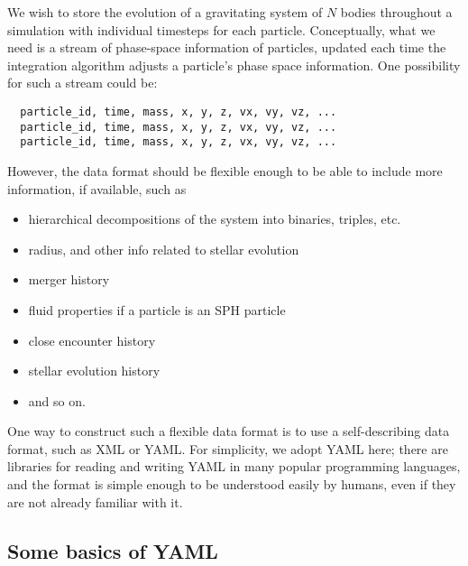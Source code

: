 \documentclass[5p,authoryear]{elsarticle}
\begin{document}
We wish to store the evolution of a gravitating system of $N$ bodies
throughout a simulation with individual timesteps for each
particle. Conceptually, what we need is a stream of phase-space
information of particles, updated each time the integration algorithm
adjusts a particle's phase space information.  One possibility for
such a stream could be:
\begin{verbatim}
  particle_id, time, mass, x, y, z, vx, vy, vz, ...
  particle_id, time, mass, x, y, z, vx, vy, vz, ...
  particle_id, time, mass, x, y, z, vx, vy, vz, ...
\end{verbatim}
However, the data format should be flexible enough to be able to
include more information, if available, such as
\begin{itemize}
\item hierarchical decompositions of the system into binaries,
  triples, etc.
\item radius, and other info related to stellar evolution
\item merger history
\item fluid properties if a particle is an SPH particle
\item close encounter history
\item stellar evolution history
\item and so on.
\end{itemize}

One way to construct such a flexible data format is to use a 
self-describing data format, such as XML or YAML. For simplicity, we
adopt YAML \citep{YAML2011} here; there are libraries for reading and
writing YAML in many popular programming languages, and the format is
simple enough to be understood easily by humans, even if they are not
already familiar with it.

\subsection{Some basics of YAML}
\end{document}
